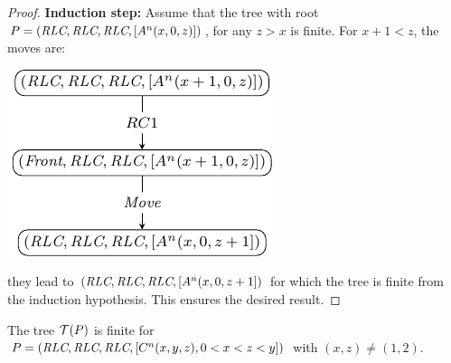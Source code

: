 \begin{proof}
\noindent \textbf{Induction step:} Assume that the tree
with root $P=(\textit{RLC}, \textit{RLC}, \textit{RLC}, [A^n(x, 0, z)])$, for any $z>x$ is
finite.
For $x+1 < z$, the moves are:
\begin{center}
\includegraphics[scale=1]{figures/figA}
\end{center}
 they lead to $(\textit{RLC}, \textit{RLC}, \textit{RLC}, 
[A^n(x, 0, z+1])$ for which the tree is finite from the induction hypothesis. 
This ensures the desired result.
\end{proof}

\begin{lemma}
\label{lemma:c} The tree $\mathcal{T}(P)$ is finite for\\
$P=(\textit{RLC}, \textit{RLC}, \textit{RLC}, [C^n(x, y, z), 0<x<z<y])$
with $(x, z) \neq (1, 2).$
\end{lemma}

